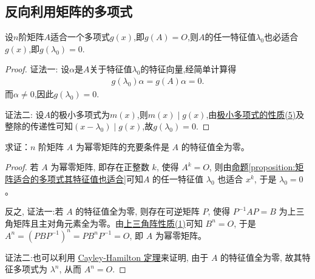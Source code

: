 \documentclass[../../main.tex]{subfiles}
\begin{document}
\subsection{反向利用矩阵的多项式}

\begin{proposition}\label{proposition:矩阵适合的多项式其特征值也适合}
设$n$阶矩阵$A$适合一个多项式$g(x)$,即$g(A) = O$,则$A$的任一特征值$\lambda_0$也必适合$g(x)$,即$g(\lambda_0) = 0$.
\end{proposition}
\begin{proof}
{\color{blue}证法一:}
设$\alpha$是$A$关于特征值$\lambda_0$的特征向量,经简单计算得
\begin{align*}
g(\lambda_0) \alpha = g(A) \alpha = 0.
\end{align*}
而$\alpha \neq 0$,因此$g(\lambda_0) = 0$.

{\color{blue}证法二:}
设$A$的极小多项式为$m(x)$,则$m(x)\mid g(x)$,由\hyperref[proposition:极小多项式的性质]{极小多项式的性质(5)}及整除的传递性可知$(x-\lambda_0)\mid g(x)$,故$g(\lambda_0)=0.$
\end{proof}

\begin{proposition}[幂零矩阵关于特征值的充要条件]\label{proposition:幂零矩阵关于特征值的充要条件}
求证：$n$ 阶矩阵 $A$ 为幂零矩阵的充要条件是 $A$ 的特征值全为零。
\end{proposition}
\begin{proof}
若 $A$ 为幂零矩阵, 即存在正整数 $k$, 使得 $A^k = O$, 则由\hyperref[proposition:矩阵适合的多项式其特征值也适合]{命题\ref{proposition:矩阵适合的多项式其特征值也适合}}可知$A$ 的任一特征值 $\lambda_0$ 也适合 $x^k$, 于是 $\lambda_0 = 0$。

反之,
{\color{blue}证法一:}若 $A$ 的特征值全为零, 则存在可逆矩阵 $P$, 使得 $P^{-1}AP = B$ 为上三角矩阵且主对角元素全为零。由\hyperref[proposition:上三角阵性质]{上三角阵性质(1)}可知 $B^n = O$, 于是 $A^n = (PBP^{-1})^n = PB^nP^{-1} = O$, 即 $A$ 为幂零矩阵。

{\color{blue}证法二:}也可以利用 \hyperref[theorem:Cayley-Hamilton定理]{Cayley-Hamilton 定理}来证明, 由于 $A$ 的特征值全为零, 故其特征多项式为 $\lambda^n$, 从而 $A^n = O$.
\end{proof}
\end{document}
